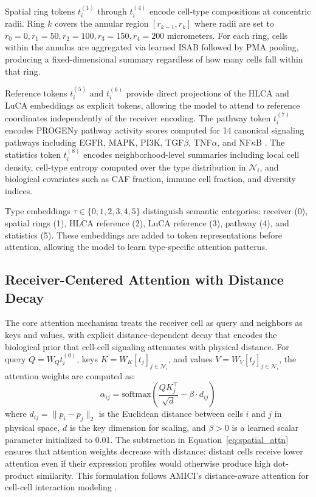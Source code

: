 \documentclass[conference]{IEEEtran}
\begin{document}
Spatial ring tokens $t_i^{(1)}$ through $t_i^{(4)}$ encode cell-type compositions at concentric radii. Ring $k$ covers the annular region $[r_{k-1}, r_k]$ where radii are set to $r_0 = 0, r_1 = 50, r_2 = 100, r_3 = 150, r_4 = 200$ micrometers. For each ring, cells within the annulus are aggregated via learned ISAB followed by PMA pooling, producing a fixed-dimensional summary regardless of how many cells fall within that ring.

Reference tokens $t_i^{(5)}$ and $t_i^{(6)}$ provide direct projections of the HLCA and LuCA embeddings as explicit tokens, allowing the model to attend to reference coordinates independently of the receiver encoding. The pathway token $t_i^{(7)}$ encodes PROGENy pathway activity scores computed for 14 canonical signaling pathways including EGFR, MAPK, PI3K, TGF$\beta$, TNF$\alpha$, and NF$\kappa$B \cite{Schubert2018-ph, Badia-I-Mompel2022-te}. The statistics token $t_i^{(8)}$ encodes neighborhood-level summaries including local cell density, cell-type entropy computed over the type distribution in $\mathcal{N}_i$, and biological covariates such as CAF fraction, immune cell fraction, and diversity indices.

Type embeddings $\tau \in \{0, 1, 2, 3, 4, 5\}$ distinguish semantic categories: receiver (0), spatial rings (1), HLCA reference (2), LuCA reference (3), pathway (4), and statistics (5). These embeddings are added to token representations before attention, allowing the model to learn type-specific attention patterns.

\subsection{Receiver-Centered Attention with Distance Decay}

The core attention mechanism treats the receiver cell as query and neighbors as keys and values, with explicit distance-dependent decay that encodes the biological prior that cell-cell signaling attenuates with physical distance. For query $Q = W_Q t_i^{(0)}$, keys $K = W_K [t_j]_{j \in \mathcal{N}_i}$, and values $V = W_V [t_j]_{j \in \mathcal{N}_i}$, the attention weights are computed as:
\begin{equation}
\alpha_{ij} = \text{softmax}\left(\frac{Q K_j^\top}{\sqrt{d}} - \beta \cdot d_{ij}\right)
\label{eq:spatial_attn}
\end{equation}
where $d_{ij} = \|p_i - p_j\|_2$ is the Euclidean distance between cells $i$ and $j$ in physical space, $d$ is the key dimension for scaling, and $\beta > 0$ is a learned scalar parameter initialized to 0.01. The subtraction in Equation~\ref{eq:spatial_attn} ensures that attention weights decrease with distance: distant cells receive lower attention even if their expression profiles would otherwise produce high dot-product similarity. This formulation follows AMICI's distance-aware attention for cell-cell interaction modeling \cite{Hong2025-jm}.
\end{document}
